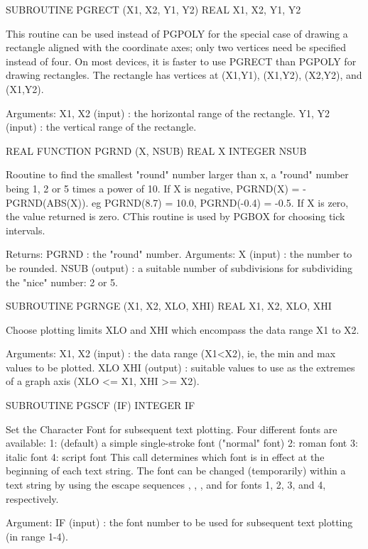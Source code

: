 {\eightpoint\begintt
      SUBROUTINE PGRECT (X1, X2, Y1, Y2)
      REAL X1, X2, Y1, Y2
 
This routine can be used instead of PGPOLY for the special case of
drawing a rectangle aligned with the coordinate axes; only two
vertices need be specified instead of four.  On most devices, it is
faster to use PGRECT than PGPOLY for drawing rectangles.  The
rectangle has vertices at (X1,Y1), (X1,Y2), (X2,Y2), and (X1,Y2).
 
Arguments:
 X1, X2 (input) : the horizontal range of the rectangle.
 Y1, Y2 (input) : the vertical range of the rectangle.
\endtt}

{\eightpoint\begintt
      REAL FUNCTION PGRND (X, NSUB)
      REAL X
      INTEGER NSUB
 
Rooutine to find the smallest "round" number larger than x, a
"round" number being 1, 2 or 5 times a power of 10. If X is negative,
PGRND(X) = -PGRND(ABS(X)). eg PGRND(8.7) = 10.0,
PGRND(-0.4) = -0.5.  If X is zero, the value returned is zero.
CThis routine is used by PGBOX for choosing  tick intervals.
 
Returns:
 PGRND         : the "round" number.
Arguments:
 X      (input)  : the number to be rounded.
 NSUB   (output) : a suitable number of subdivisions for
                   subdividing the "nice" number: 2 or 5.
\endtt}

{\eightpoint\begintt
      SUBROUTINE PGRNGE (X1, X2, XLO, XHI)
      REAL X1, X2, XLO, XHI
 
Choose plotting limits XLO and XHI which encompass the data
range X1 to X2.
 
Arguments:
 X1, X2 (input)  : the data range (X1<X2), ie, the min and max values
                   to be plotted.
 XLO
 XHI    (output) : suitable values to use as the extremes of a graph
                   axis (XLO <= X1, XHI >= X2).
\endtt}

{\eightpoint\begintt
      SUBROUTINE PGSCF (IF)
      INTEGER  IF
 
Set the Character Font for subsequent text plotting. Four different
fonts are available:
  1: (default) a simple single-stroke font ("normal" font)
  2: roman font
  3: italic font
  4: script font
This call determines which font is in effect at the beginning of
each text string. The font can be changed (temporarily) within a text
string by using the escape sequences \fn, \fr, \fi, and \fs for fonts
1, 2, 3, and 4, respectively.
 
Argument:
 IF     (input)  : the font number to be used for subsequent text
                   plotting (in range 1-4).
\endtt}

